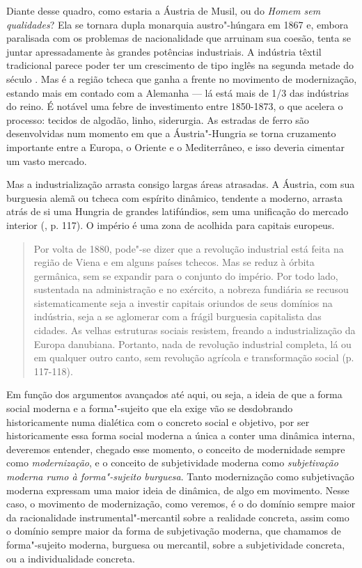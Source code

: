 Diante desse quadro, como estaria a Áustria de Musil, ou do \emph{Homem
sem qualidades}? Ela se tornara dupla monarquia austro"-húngara em 1867
e, embora paralisada com os problemas de nacionalidade que arruinam sua
coesão, tenta se juntar apressadamente às grandes potências industriais.
A indústria têxtil tradicional parece poder ter um crescimento de tipo
inglês na segunda metade do século . Mas é a região tcheca que ganha
a frente no movimento de modernização, estando mais em contado com a
Alemanha --- lá está mais de 1/3 das indústrias do reino. É notável uma
febre de investimento entre 1850-1873, o que acelera o processo: tecidos
de algodão, linho, siderurgia. As estradas de ferro são desenvolvidas
num momento em que a Áustria"-Hungria se torna cruzamento importante
entre a Europa, o Oriente e o Mediterrâneo, e isso deveria cimentar um
vasto mercado.

Mas a industrialização arrasta consigo largas áreas atrasadas. A
Áustria, com sua burguesia alemã ou tcheca com espírito dinâmico,
tendente a moderno, arrasta atrás de si uma Hungria de grandes
latifúndios, sem uma unificação do mercado interior (, p. 117). O império é uma zona de acolhida para capitais europeus.

\begin{quote}
Por volta de 1880, pode"-se dizer que a revolução industrial está feita
na região de Viena e em alguns países tchecos. Mas se reduz à órbita
germânica, sem se expandir para o conjunto do império. Por todo lado,
sustentada na administração e no exército, a nobreza fundiária se
recusou sistematicamente seja a investir capitais oriundos de seus
domínios na indústria, seja a se aglomerar com a frágil burguesia
capitalista das cidades. As velhas estruturas sociais resistem, freando
a industrialização da Europa danubiana. Portanto, nada de revolução
industrial completa, lá ou em qualquer outro canto, sem revolução
agrícola e transformação social (p. 117-118).
\end{quote}

Em função dos argumentos avançados até aqui, ou seja, a
ideia de que a forma social moderna e a forma"-sujeito que ela exige vão
se desdobrando historicamente numa dialética com o concreto social e
objetivo, por ser historicamente essa forma social moderna a única a
conter uma dinâmica interna, deveremos entender, chegado esse momento,
o conceito de modernidade sempre como \emph{modernização},
e o conceito de subjetividade moderna como \emph{subjetivação moderna
rumo à forma"-sujeito burguesa}. Tanto modernização como subjetivação
moderna expressam uma maior ideia de dinâmica, de algo em movimento.
Nesse caso, o movimento de modernização, como veremos, é o do domínio
sempre maior da racionalidade instrumental"-mercantil sobre a realidade
concreta, assim como o domínio sempre maior da forma de subjetivação
moderna, que chamamos de forma"-sujeito moderna, burguesa ou mercantil,
sobre a subjetividade concreta, ou a individualidade concreta.

